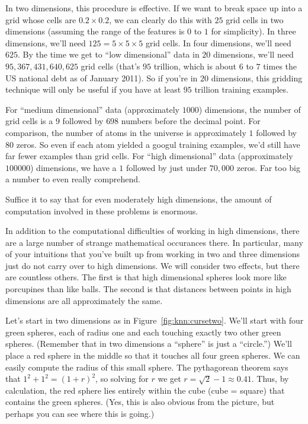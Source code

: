 In two dimensions, this procedure is effective.  If we want to break
space up into a grid whose cells are $0.2 \times 0.2$, we can clearly
do this with $25$ grid cells in two dimensions (assuming the range of
the features is $0$ to $1$ for simplicity).  In three dimensions,
we'll need $125 = 5 \times 5 \times 5$ grid cells.  In four
dimensions, we'll need $625$.  By the time we get to ``low
dimensional'' data in $20$ dimensions, we'll need $95,367,431,640,625$
grid cells (that's $95$ trillion, which is about $6$ to $7$ times the
US national debt as of January 2011).  So if you're in $20$
dimensions, this gridding technique will only be useful if you have at
least $95$ trillion training examples.

For ``medium dimensional'' data (approximately $1000$) dimensions, the
number of grid cells is a $9$ followed by $698$ numbers before the
decimal point.  For comparison, the number of atoms in the universe is
approximately $1$ followed by $80$ zeros.  So even if each atom
yielded a googul training examples, we'd still have far fewer
examples than grid cells.  For ``high dimensional'' data
(approximately $100000$) dimensions, we have a $1$ followed by just
under $70,000$ zeros.  Far too big a number to even really comprehend.

Suffice it to say that for even moderately high dimensions, the amount
of computation involved in these problems is enormous.


In addition to the computational difficulties of working in high
dimensions, there are a large number of strange mathematical
occurances there.  In particular, many of your intuitions that you've
built up from working in two and three dimensions just do not carry
over to high dimensions.  We will consider two effects, but there are
countless others.  The first is that high dimensional spheres look
more like porcupines than like balls.
The second is that distances between points in high dimensions are all
approximately the same.


Let's start in two dimensions as in Figure~\ref{fig:knn:cursetwo}.
We'll start with four green spheres, each of radius one and each
touching exactly two other green spheres.  (Remember that in two
dimensions a ``sphere'' is just a ``circle.'')  We'll place a red
sphere in the middle so that it touches all four green spheres.  We
can easily compute the radius of this small sphere.  The pythagorean
theorem says that $1^2 + 1^2 = (1+r)^2$, so solving for $r$ we get $r
= \sqrt 2 - 1 \approx 0.41$.  Thus, by calculation, the red sphere
lies entirely within the cube (cube = square) that contains the green
spheres.  (Yes, this is also obvious from the picture, but perhaps you
can see where this is going.)

